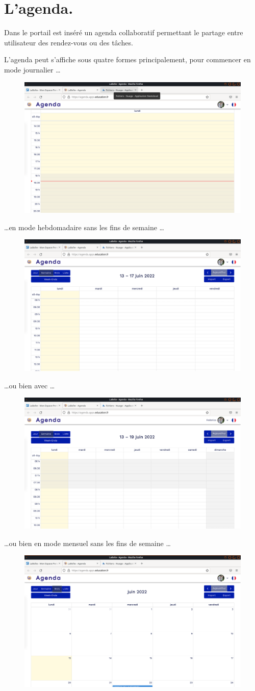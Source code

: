 \chapter{L'agenda.}
Dans le portail est inséré un agenda collaboratif permettant le partage entre utilisateur des rendez-vous ou des tâches.

L'agenda peut s'affiche sous quatre formes principalement, pour commencer en mode journalier \ldots
\begin{figure}
    \centering
    \includegraphics[width=0.500\linewidth]{Captures/agenda.jour.png}
\end{figure}
\ldots en mode hebdomadaire sans les fins de semaine \ldots
\begin{figure}
    \centering
    \includegraphics[width=0.500\linewidth]{Captures/agenda.semaine.png}
\end{figure}
\ldots ou bien avec \ldots
\begin{figure}
    \centering
    \includegraphics[width=0.500\linewidth]{Captures/agenda.semaine.we.png}
\end{figure}
\ldots ou bien en mode mensuel sans les fins de semaine \ldots
\begin{figure}
    \centering
    \includegraphics[width=0.500\linewidth]{Captures/agenda.mois.png}
\end{figure}
